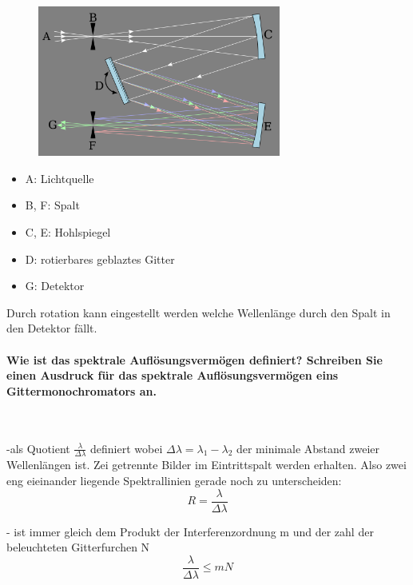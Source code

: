 \documentclass[a4paper, 11pt, ngerman, parskip=half]{scrartcl}
\begin{document}
\begin{figure}[H]
    \centering
    \includegraphics[width=8cm]{image/22/Czerny-Turner.png}
\end{figure}
\begin{itemize}
    \item[] A: Lichtquelle
    \item[] B, F: Spalt
    \item[] C, E: Hohlspiegel
    \item[] D: rotierbares geblaztes Gitter
    \item[] G: Detektor
\end{itemize}
Durch rotation kann eingestellt werden welche Wellenlänge durch den Spalt in den Detektor fällt.
\paragraph{Wie ist das spektrale Auflösungsvermögen definiert? Schreiben Sie einen Ausdruck für das
spektrale Auflösungsvermögen eins Gittermonochromators an.} ~

-als Quotient $\frac{\lambda}{\Delta \lambda}$ definiert wobei $\Delta \lambda = \lambda_1 - \lambda_2$ der minimale Abstand zweier Wellenlängen ist. Zei getrennte Bilder im Eintrittspalt werden erhalten. Also zwei eng eieinander liegende Spektrallinien gerade noch zu unterscheiden:
\begin{equation}
R = \frac{\lambda}{\Delta \lambda}
\end{equation}

- ist immer gleich dem Produkt der Interferenzordnung m und der zahl der beleuchteten Gitterfurchen N
\begin{equation}
\frac{\lambda}{\Delta \lambda} \leq mN
\end{equation}
\newpage
\end{document}
